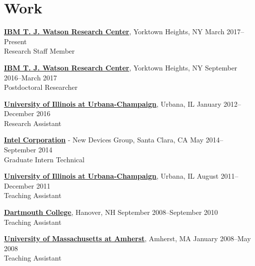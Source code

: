 
\section{\sc Work}
{\href{http://research.ibm.com/labs/watson/index.shtml}{\bf IBM T. J. Watson Research Center}}, Yorktown Heights, NY \hfill March 2017--Present\\
Research Staff Member
\vspace{-0.16cm}

{\href{http://research.ibm.com/labs/watson/index.shtml}{\bf IBM T. J. Watson Research Center}}, Yorktown Heights, NY \hfill September 2016--March 2017\\
Postdoctoral Researcher
\vspace{-0.16cm}

{\href{http://www.illinois.edu/}{{\bf University of Illinois at Urbana-Champaign}}}, Urbana, IL \hfill January 2012--December 2016\\
Research Assistant
\vspace{-0.16cm}

{\href{http://www.intel.com/}{{\bf Intel Corporation}}} - New Devices Group, Santa Clara, CA \hfill May 2014--September 2014\\
Graduate Intern Technical
\vspace{-0.16cm}

{\href{http://www.illinois.edu/}{{\bf University of Illinois at Urbana-Champaign}}}, Urbana, IL \hfill August 2011--December 2011\\
Teaching Assistant
\vspace{-0.16cm}

{\href{http://www.dartmouth.edu/}{{\bf Dartmouth College}}}, Hanover, NH \hfill September 2008--September 2010\\
Teaching Assistant
\vspace{-0.16cm}

{\href{http://www.umass.edu/}{{\bf University of Massachusetts at Amherst}}}, Amherst, MA \hfill January 2008--May 2008\\
Teaching Assistant
